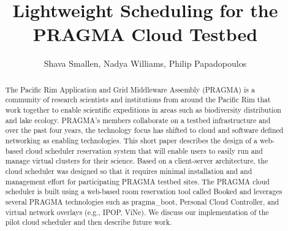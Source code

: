 \documentclass[times]{cpeauth}
\begin{document}

\sloppy %

\title{Lightweight Scheduling for the PRAGMA Cloud Testbed} 

\author{Shava Smallen\corrauth, Nadya Williams, Philip Papadopoulos}

\address{San Diego Supercomputer Center\break
University of California San Diego, 9500 Gilman Drive, La Jolla, CA 92093}\break


\begin{abstract}
The Pacific Rim Application and Grid Middleware Assembly (PRAGMA) is a community of research scientists and institutions from around the Pacific Rim that work together to enable scientific expeditions in areas such as biodiversity distribution and lake ecology.  PRAGMA's members collaborate on a testbed infrastructure and over the past four years, the technology focus has shifted to cloud and software defined networking as enabling technologies.  This short paper describes the design of a web-based cloud scheduler reservation system that will enable users to easily run and manage virtual clusters for their science.  Based on a client-server architecture, the cloud scheduler was designed so that it requires minimal installation and and management effort for participating PRAGMA testbed sites.   The PRAGMA cloud scheduler is built using a web-based room reservation tool called Booked and leverages several PRAGMA technologies such as pragma\_boot, Personal Cloud Controller,  and virtual network overlays (e.g., IPOP, ViNe).  We discuss our implementation of the pilot cloud scheduler and then describe future work.   
\end{abstract}


\maketitle

\vspace{-6pt}


\end{document}
